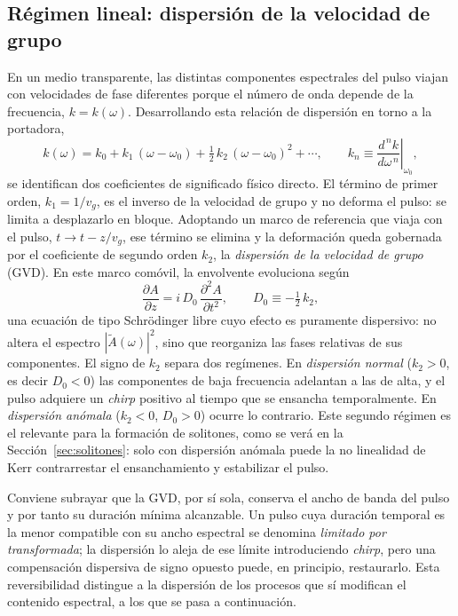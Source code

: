 \subsection{Régimen lineal: dispersión de la velocidad de grupo}

En un medio transparente, las distintas componentes espectrales del pulso viajan
con velocidades de fase diferentes porque el número de onda depende de la
frecuencia, $k=k(\omega)$. Desarrollando esta relación de dispersión en torno a la
portadora,
%
\begin{equation}
    k(\omega) = k_0 + k_1\,(\omega-\omega_0)
    + \tfrac{1}{2}\,k_2\,(\omega-\omega_0)^2 + \cdots,
    \qquad
    k_n \equiv \left.\frac{d^{\,n}k}{d\omega^{\,n}}\right|_{\omega_0},
    \label{eq:beta_expansion}
\end{equation}
%
se identifican dos coeficientes de significado físico directo. El término de
primer orden, $k_1 = 1/v_g$, es el inverso de la velocidad de grupo y no deforma
el pulso: se limita a desplazarlo en bloque. Adoptando un marco de referencia que
viaja con el pulso, $t \to t - z/v_g$, ese término se elimina y la deformación
queda gobernada por el coeficiente de segundo orden $k_2$, la \emph{dispersión de
la velocidad de grupo} (GVD). En este marco comóvil, la envolvente evoluciona
según
%
\begin{equation}
    \frac{\partial A}{\partial z}
    = i\,D_0\,\frac{\partial^2 A}{\partial t^2},
    \qquad D_0 \equiv -\tfrac{1}{2}\,k_2 ,
    \label{eq:gvd_prop}
\end{equation}
%
una ecuación de tipo Schrödinger libre cuyo efecto es puramente dispersivo: no
altera el espectro $|\tilde A(\omega)|^2$, sino que reorganiza las fases
relativas de sus componentes. El signo de $k_2$ separa dos regímenes. En
\emph{dispersión normal} ($k_2>0$, es decir $D_0<0$) las componentes de baja
frecuencia adelantan a las de alta, y el pulso adquiere un \emph{chirp} positivo
al tiempo que se ensancha temporalmente. En \emph{dispersión anómala}
($k_2<0$, $D_0>0$) ocurre lo contrario. Este segundo régimen es el relevante para
la formación de solitones, como se verá en la Sección~\ref{sec:solitones}: solo
con dispersión anómala puede la no linealidad de Kerr contrarrestar el
ensanchamiento y estabilizar el pulso.

Conviene subrayar que la GVD, por sí sola, conserva el ancho de banda del pulso y
por tanto su duración mínima alcanzable. Un pulso cuya duración temporal es la
menor compatible con su ancho espectral se denomina \emph{limitado por
transformada}; la dispersión lo aleja de ese límite introduciendo \emph{chirp},
pero una compensación dispersiva de signo opuesto puede, en principio,
restaurarlo. Esta reversibilidad distingue a la dispersión de los procesos que sí
modifican el contenido espectral, a los que se pasa a continuación.

